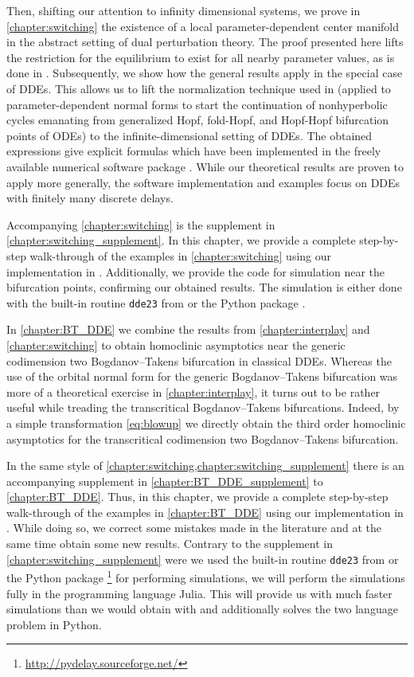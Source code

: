 Then, shifting our attention to infinity dimensional systems,  we prove in
\cref{chapter:switching} the existence of a local parameter-dependent center
manifold in the abstract setting of dual perturbation theory. The proof
presented here lifts the restriction for the equilibrium to exist for all
nearby parameter values, as is done in \cite{diekmann1995delay}. Subsequently,
we show how the general results apply in the special case of DDEs. This allows
us to lift the normalization technique used in \cite{Kuznetsov2008} (applied to
parameter-dependent normal forms to start the continuation of nonhyperbolic
cycles emanating from generalized Hopf, fold-Hopf, and Hopf-Hopf bifurcation
points of ODEs) to the infinite-dimensional setting of DDEs. The obtained
expressions give explicit formulas which have been implemented in the freely
available numerical software package \DDEBIFTOOL. While our theoretical results
are proven to apply more generally, the software implementation and examples
focus on DDEs with finitely many discrete delays.

Accompanying \cref{chapter:switching} is the supplement in
\cref{chapter:switching_supplement}. In this chapter, we provide a complete
step-by-step walk-through of the examples in \cref{chapter:switching} using our
implementation in \DDEBIFTOOL. Additionally, we provide the code for simulation
near the bifurcation points, confirming our obtained results. The simulation is
either done with the built-in routine \lstinline|dde23| from \MATLAB
\cite{Shampine01solvingdelay} or the Python package \PYDELAY
\cite{Flunkert2009Flunkert}.

In \cref{chapter:BT_DDE} we combine the results from \cref{chapter:interplay} and
\cref{chapter:switching} to obtain homoclinic asymptotics near the generic
codimension two Bogdanov--Takens bifurcation in classical DDEs. Whereas the use
of the orbital normal form for the generic Bogdanov--Takens bifurcation was more
of a theoretical exercise in \cref{chapter:interplay}, it turns out to be rather
useful while treading the transcritical Bogdanov--Takens bifurcations. Indeed, by
a simple transformation \cref{eq:blowup} we directly obtain the third order
homoclinic asymptotics for the transcritical codimension two Bogdanov--Takens
bifurcation.

In the same style of \cref{chapter:switching,chapter:switching_supplement}
there is an accompanying supplement in \cref{chapter:BT_DDE_supplement} to
\cref{chapter:BT_DDE}. Thus, in this chapter, we provide a complete
step-by-step walk-through of the examples in \cref{chapter:BT_DDE} using our
implementation in \DDEBIFTOOL. While doing so, we correct some mistakes made in
the literature and at the same time obtain some new results. Contrary to the
supplement in \cref{chapter:switching_supplement} were we used the built-in
routine \lstinline|dde23| from \MATLAB \cite{Shampine01solvingdelay} or the
Python package \PYDELAY\footnote{\url{http://pydelay.sourceforge.net/}}
\cite{Flunkert2009Flunkert} for performing simulations, we will perform the
simulations fully in the programming language Julia. This will provide us with
much faster simulations than we would obtain with \MATLAB and additionally
solves the two language problem in Python.

